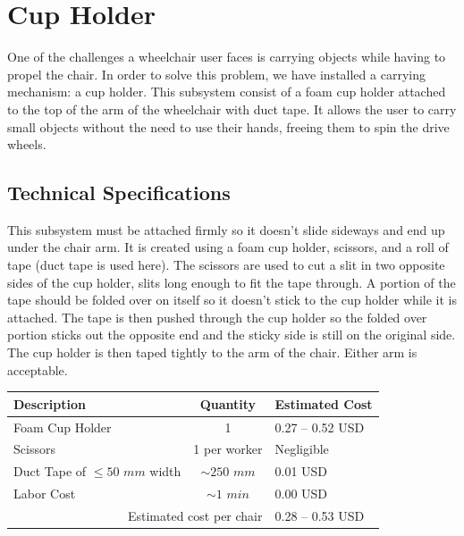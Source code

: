 
\section{Cup Holder}
One of the challenges a wheelchair user faces is carrying objects while having
to propel the chair. In order to solve this problem, we have installed a
carrying mechanism: a cup holder. This subsystem consist of a foam cup holder
attached to the top of the arm of the wheelchair with duct tape. It allows the
user to carry small objects without the need to use their hands, freeing them
to spin the drive wheels.

\subsection{Technical Specifications}
This subsystem must be attached firmly so it doesn't slide sideways and end up
under the chair arm. It is created using a foam cup holder, scissors, and a
roll of tape (duct tape is used here). The scissors are used to cut a slit in
two opposite sides of the cup holder, slits long enough to fit the tape
through. A portion of the tape should be folded over on itself so it doesn't
stick to the cup holder while it is attached. The tape is then pushed through
the cup holder so the folded over portion sticks out the opposite end and the
sticky side is still on the original side. The cup holder is then taped tightly
to the arm of the chair. Either arm is acceptable.

\begin{table}[H]
    \centering
    \label{tbl:cupholder-cost}
    \caption{Cup Holder Cost Analysis}
    \begin{longtable}{l c l}
        Description & Quantity & Estimated Cost \\
        \hline
        Foam Cup Holder & 1 & 0.27 -- 0.52 USD\cite{cost-cupholder} \\
        Scissors & 1 per worker & Negligible \\
        Duct Tape of $\leq 50$ $mm$ width & $\sim 250$ $mm$ & 0.01
        USD\footnotemark[1] \\
        Labor Cost & $\sim 1$ $min$ & 0.00 USD\footnotemark[2] \\
        \hline
        \multicolumn{2}{r}{Estimated cost per chair} & 0.28 -- 0.53 USD
    \end{longtable}
\end{table}
